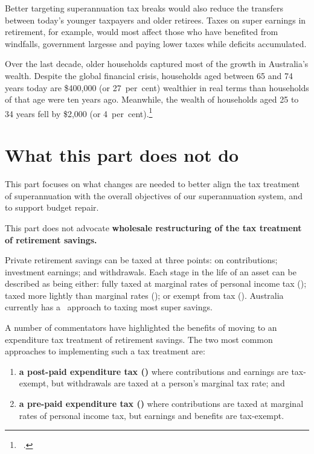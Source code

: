 Better targeting superannuation tax breaks would also reduce the transfers between today’s younger taxpayers and older retirees. Taxes on super earnings in retirement, for example, would most affect those who have benefited from windfalls, government largesse and paying lower taxes while deficits accumulated.

Over the last decade, older households captured most of the growth in Australia’s wealth. Despite the global financial crisis, households aged between 65 and 74 years today are \$400,000 (or 27~per~cent) wealthier in real terms than households of that age were ten years ago. Meanwhile, the wealth of households aged 25 to 34 years fell by \$2,000 (or 4~per~cent).\footnote{\gao\ \textcites{ABS2015HouseholdIncomeWealth1314}{ABS2006HES0304}.}

\section{What this part does not do}\label{sec:SUPER-what-this-report-does-not-do}
This part focuses on what changes are needed to better align the tax treatment of superannuation with the overall objectives of our superannuation system, and to support budget repair. 

This part does not advocate \textbf{wholesale restructuring of the tax treatment of retirement savings. }

Private retirement savings can be taxed at three points: on contributions; investment earnings; and withdrawals. Each stage in the life of an asset can be described as being either: fully taxed at marginal rates of personal income tax (\taxabbrevT); taxed more lightly than marginal rates (\taxabbrevt); or exempt from tax (\taxabbrevE). Australia currently has a \ttE\ approach to taxing most super savings.

A number of commentators have highlighted the benefits of moving to an expenditure tax treatment of retirement savings.  The two most common approaches to implementing such a  tax treatment are:
\begin{enumerate}
\item \textbf{a post-paid expenditure tax (\EET)} where contributions and earnings are tax-exempt, but withdrawals are taxed at a person's marginal tax rate; and
\item \textbf{a pre-paid expenditure tax (\TEE)} where contributions are taxed at marginal rates of personal income tax, but earnings and benefits are tax-exempt. 
\end{enumerate}

